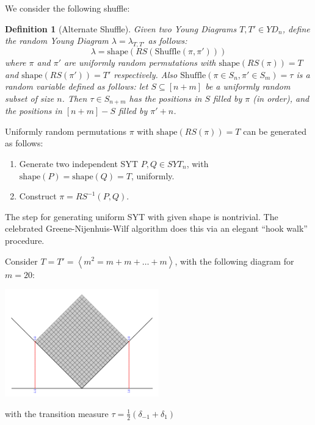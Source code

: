 \documentclass[aspectratio=169]{beamer}
\newtheorem{defn}[theorem]{Definition}
\newcommand{\perm}[1]{\left\langle#1\right\rangle}
\newcommand{\shape}{\mathrm{shape}}
\begin{document}
\begin{frame}
We consider the following shuffle: \pause

\begin{defn}[Alternate Shuffle]
    Given two Young Diagrams $T, T' \in YD_n$, define the random Young Diagram $\lambda = \lambda_{T, T'}$ as follows:
    \[%
        \lambda = \shape(RS(\mathrm{Shuffle}(\pi, \pi')))
    \]
    where $\pi$ and $\pi'$ are uniformly random permutations with $\shape(RS(\pi)) = T$ and $\shape(RS(\pi')) = T'$ respectively. \pause Also $\mathrm{Shuffle}(\pi \in S_n, \pi' \in S_m) = \tau$ is a random variable defined as follows: let $S \subseteq [n + m]$ be a uniformly random subset of size $n$. Then $\tau \in S_{n + m}$ has the positions in $S$ filled by $\pi$ (in order), and the positions in $[n + m] - S$ filled by $\pi' + n$. 
\end{defn}


\end{frame}


\begin{frame}
 
Uniformly random permutations $\pi$ with $\shape(RS(\pi)) = T$ can be generated as follows: \pause
\begin{enumerate}
    \item<2-> Generate two independent SYT $P, Q \in SYT_n$, with $\shape(P) = \shape(Q) = T$, uniformly. 
    \item<3-> Construct $\pi = RS^{-1}(P, Q)$.
\end{enumerate}

\pause
The step for generating uniform SYT with given shape is nontrivial. The celebrated Greene-Nijenhuis-Wilf algorithm does this via an elegant ``hook walk'' procedure.
\end{frame}


\begin{frame}
Consider $T = T' = \perm{m^2 = m + m + \ldots + m}$, with the following diagram for $m = 20$: \pause
\begin{center}
    \includegraphics[width=0.5\textwidth]{sqyd}
\end{center}

with the transition measure $\tau = \frac{1}{2}\left(\delta_{-1} + \delta_{1}\right)$
\end{frame}
\end{document}
